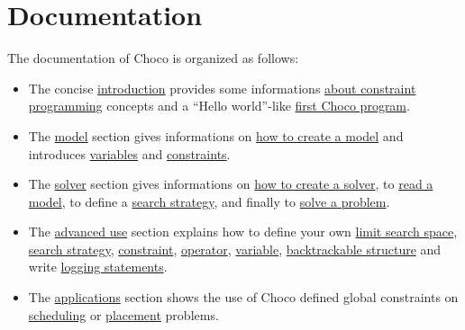\part{Documentation}\label{ch:doc}\hypertarget{ch:doc}{}

The documentation of Choco is organized as follows:
\begin{itemize}
\item 
The concise \hyperlink{doc:introduction}{introduction} provides some informations \hyperlink{introduction:aboutconstraintprogramming}{about constraint programming} concepts and a ``Hello world''-like \hyperlink{introduction:myfirstchocoprogram}{first Choco program}.
\item 
The \hyperlink{doc:model}{model} section gives informations on \hyperlink{doc:model}{how to create a model} and introduces \hyperlink{model:variables}{variables} and \hyperlink{model:constraints}{constraints}.
\item 
The \hyperlink{doc:solver}{solver} section gives informations on \hyperlink{doc:solver}{how to create a solver}, to \hyperlink{doc:solver}{read a model}, to define a \hyperlink{solver:searchstrategy}{search strategy}, and finally to \hyperlink{solver:solveaproblem}{solve a problem}.
\item 
The \hyperlink{doc:advanced}{advanced use} section explains how to define your own \hyperlink{advanced:defineyourownlimitsearchspace}{limit search space}, \hyperlink{advanced:defineyourownsearchstrategy}{search strategy}, \hyperlink{advanced:defineyourownconstraint}{constraint}, \hyperlink{advanced:defineyourownoperator}{operator}, \hyperlink{advanced:defineyourownvariable}{variable}, \hyperlink{advanced:backtrackablestructures}{backtrackable structure} and write \hyperlink{advanced:howtowriteloggingstatements}{logging statements}.
\item 
The \hyperlink{doc:applications}{applications} section shows the use of Choco defined global constraints on \hyperlink{schedulinganduseofthecumulative:schedulinganduseofthecumulativeconstraint}{scheduling} or \hyperlink{geostdescription:placementanduseofthegeostconstraint}{placement} problems.
\end{itemize}


